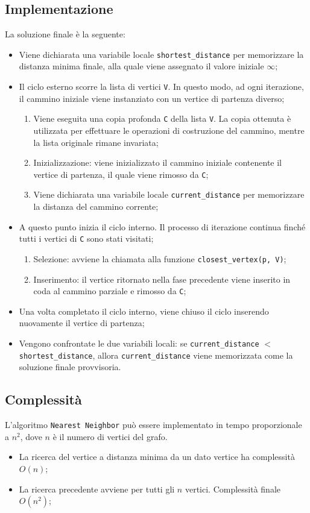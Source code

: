 \subsection{Implementazione}
 La soluzione finale è la seguente:
\begin{itemize}
	\item Viene dichiarata una variabile locale \texttt{shortest\_distance} per memorizzare la distanza minima finale, alla quale viene assegnato il valore iniziale $\infty$;
	\item Il ciclo esterno scorre la lista di vertici \texttt{V}. In questo modo, ad ogni iterazione, il cammino iniziale viene instanziato con un vertice di partenza diverso; 
	\begin{enumerate}
		\item Viene eseguita una copia profonda \texttt{C} della lista \texttt{V}. La copia ottenuta è utilizzata per effettuare le operazioni di costruzione del cammino, mentre la lista originale rimane invariata;
		\item Inizializzazione: viene inizializzato il cammino iniziale contenente il vertice di partenza, il quale viene rimosso da \texttt{C};
		\item Viene dichiarata una variabile locale \texttt{current\_distance} per memorizzare la distanza del cammino corrente;
	\end{enumerate}
	\item A questo punto inizia il ciclo interno. Il processo di iterazione continua finché tutti i vertici di \texttt{C} sono stati visitati;
	\begin{enumerate}
		\item Selezione: avviene la chiamata alla funzione \texttt{closest\_vertex(p, V)};
		\item Inserimento: il vertice ritornato nella fase precedente viene inserito in coda al cammino parziale e rimosso da \texttt{C};
	\end{enumerate}  
	\item Una volta completato il ciclo interno, viene chiuso il ciclo inserendo nuovamente il vertice di partenza;
	\item Vengono confrontate le due variabili locali: se \texttt{current\_distance} $<$ \texttt{shortest\_distance}, allora \texttt{current\_distance} viene memorizzata come la soluzione finale provvisoria.
\end{itemize}

\subsection{Complessità}
L'algoritmo \texttt{Nearest Neighbor} può essere implementato in tempo proporzionale a $n^2$, dove $n$ è il numero di vertici del grafo.
\begin{itemize}
	\item La ricerca del vertice a distanza minima da un dato vertice ha complessità $O(n)$;
	\item La ricerca precedente avviene per tutti gli $n$ vertici. Complessità finale $O(n^2)$;
	
\end{itemize}
\pagebreak